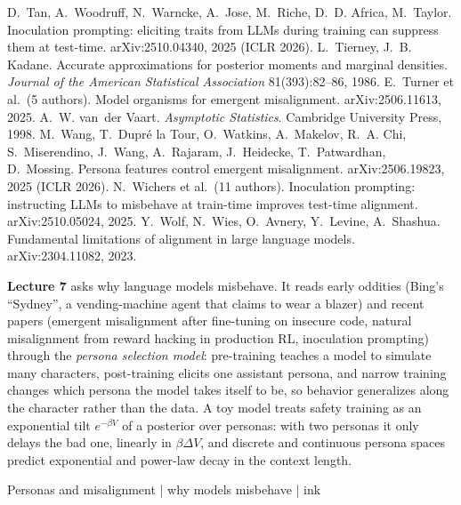  D.~Tan, A.~Woodruff, N.~Warncke, A.~Jose, M.~Riche, D.~D. Africa, M.~Taylor. Inoculation prompting: eliciting traits from LLMs during training can suppress them at test-time. arXiv:2510.04340, 2025 (ICLR 2026).
 L.~Tierney, J.~B. Kadane. Accurate approximations for posterior moments and marginal densities. \emph{Journal of the American Statistical Association} 81(393):82--86, 1986.
 E.~Turner et al.\ (5 authors). Model organisms for emergent misalignment. arXiv:2506.11613, 2025.
 A.~W. van~der Vaart. \emph{Asymptotic Statistics}. Cambridge University Press, 1998.
 M.~Wang, T.~Dupr\'e la Tour, O.~Watkins, A.~Makelov, R.~A. Chi, S.~Miserendino, J.~Wang, A.~Rajaram, J.~Heidecke, T.~Patwardhan, D.~Mossing. Persona features control emergent misalignment. arXiv:2506.19823, 2025 (ICLR 2026).
 N.~Wichers et al.\ (11 authors). Inoculation prompting: instructing LLMs to misbehave at train-time improves test-time alignment. arXiv:2510.05024, 2025.
 Y.~Wolf, N.~Wies, O.~Avnery, Y.~Levine, A.~Shashua. Fundamental limitations of alignment in large language models. arXiv:2304.11082, 2023.

\textbf{Lecture 7} asks why language models misbehave. It reads early oddities (Bing's ``Sydney'', a vending-machine agent that claims to wear a blazer) and recent papers (emergent misalignment after fine-tuning on insecure code, natural misalignment from reward hacking in production RL, inoculation prompting) through the \emph{persona selection model}: pre-training teaches a model to simulate many characters, post-training elicits one assistant persona, and narrow training changes which persona the model takes itself to be, so behavior generalizes along the character rather than the data. A toy model treats safety training as an exponential tilt $e^{-\beta V}$ of a posterior over personas: with two personas it only delays the bad one, linearly in $\beta\Delta V$, and discrete and continuous persona spaces predict exponential and power-law decay in the context length.

Personas and misalignment | why models misbehave | ink
